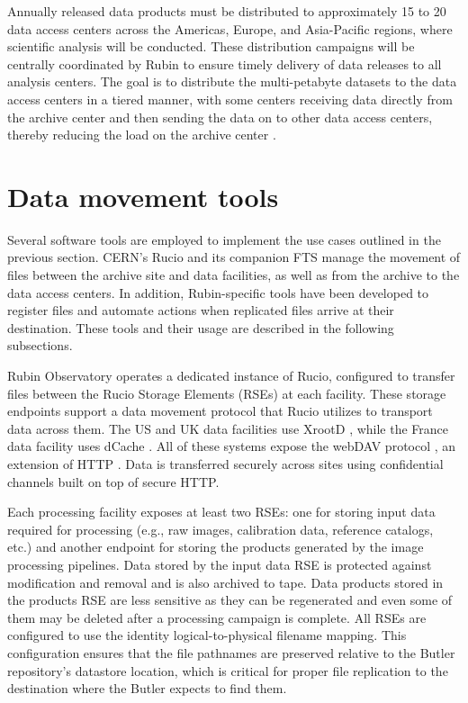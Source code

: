 \documentclass{webofc}
\begin{document}
Annually released data products must be distributed to approximately 15 to 20 data access centers across the Americas, Europe, and Asia-Pacific regions, where scientific analysis will be conducted. These distribution campaigns will be centrally coordinated by Rubin to ensure timely delivery of data releases to all analysis centers. The goal is to distribute the multi-petabyte datasets to the data access centers in a tiered manner, with some centers receiving data directly from the archive center and then sending the data on to other data access centers, thereby reducing the load on the archive center \cite{RTN-086}.

\section{Data movement tools}
\label{section-data-movement-tools}

Several software tools are employed to implement the use cases outlined in the previous section. CERN's Rucio \cite{rucio2019} and its companion FTS \cite{FTS} manage the movement of files between the archive site and data facilities, as well as from the archive to the data access centers. In addition, Rubin-specific tools have been developed to register files and automate actions when replicated files arrive at their destination. These tools and their usage are described in the following subsections.

Rubin Observatory operates a dedicated instance of Rucio, configured to transfer files between the Rucio Storage Elements (RSEs) at each facility. These storage endpoints support a data movement protocol that Rucio utilizes to transport data across them. The US and UK data facilities use XrootD \cite{xrootd}, while the France data facility uses dCache \cite{dCache}. All of these systems expose the webDAV protocol \cite{webdav}, an extension of HTTP \cite{http1.1}. Data is transferred securely across sites using confidential channels built on top of secure HTTP.

Each processing facility exposes at least two RSEs: one for storing input data required for processing (e.g., raw images, calibration data, reference catalogs, etc.) and another endpoint for storing the products generated by the image processing pipelines. Data stored by the input data RSE is protected against modification and removal and is also archived to tape. Data products stored in the products RSE are less sensitive as they can be regenerated and even some of them may be deleted after a processing campaign is complete. All RSEs are configured to use the identity logical-to-physical filename mapping. This configuration ensures that the file pathnames are preserved relative to the Butler repository's datastore location, which is critical for proper file replication to the destination where the Butler expects to find them.
\end{document}
